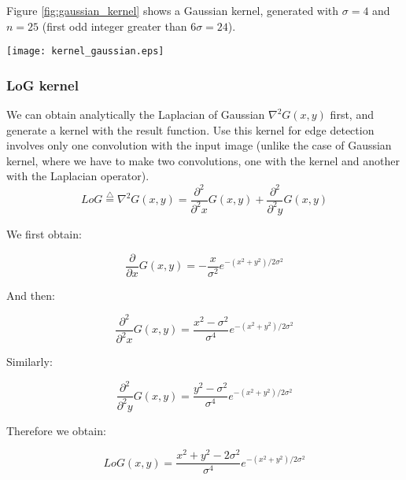 \documentclass{ipol}
\numberwithin{equation}{section}
\numberwithin{table}{section}
\begin{document}
Figure \ref{fig:gaussian_kernel} shows a Gaussian kernel, generated with $\sigma = 4$ and $n = 25$ 
(first odd integer greater than $6\sigma=24$).\\

\begin{SCfigure}[][!t]
	\centering
	\texttt{[image: kernel\_gaussian.eps]}
	\caption{Gaussian kernel, $\sigma=4$, $n=25$. Is easy to see that the selected value of n is 
sufficient to have a good approximation of the Gaussian function in the kernel.}
	\label{fig:gaussian_kernel}
\end{SCfigure}

\subsubsection{LoG kernel}

We can obtain analytically the Laplacian of Gaussian $\nabla^2G(x,y)$ first, and generate a kernel 
with the result function. Use this kernel for edge detection involves only one convolution with 
the input image (unlike the case of Gaussian kernel, where we have to make two convolutions, one 
with the kernel and another with the Laplacian operator).\\

\begin{equation}
	LoG \stackrel{\triangle}{=}\nabla^2G(x,y)=\frac{\partial^2}{\partial^2 x}G(x,y) + \frac{\partial^2}{\partial^2 y}G(x,y)
\end{equation}

We first obtain:

\begin{equation} 
	\frac{\partial}{\partial x}G(x,y)=-\frac{x}{\sigma^2}e^{-(x^2+y^2)/2\sigma^2}
\end{equation}

And then:

\begin{equation} 
	\frac{\partial^2}{\partial^2 x}G(x,y)=\frac{x^2-\sigma^2}{\sigma^4}e^{-(x^2+y^2)/2\sigma^2} 
\end{equation}

Similarly:

\begin{equation} 
	\frac{\partial^2}{\partial^2 y}G(x,y)=\frac{y^2-\sigma^2}{\sigma^4}e^{-(x^2+y^2)/2\sigma^2} 
\end{equation}

Therefore we obtain:

\begin{equation}
	\label{eq:log_function}
	LoG(x,y)=\frac{x^2+y^2-2\sigma^2}{\sigma^4}e^{-(x^2+y^2)/2\sigma^2}
\end{equation}\\
\end{document}
